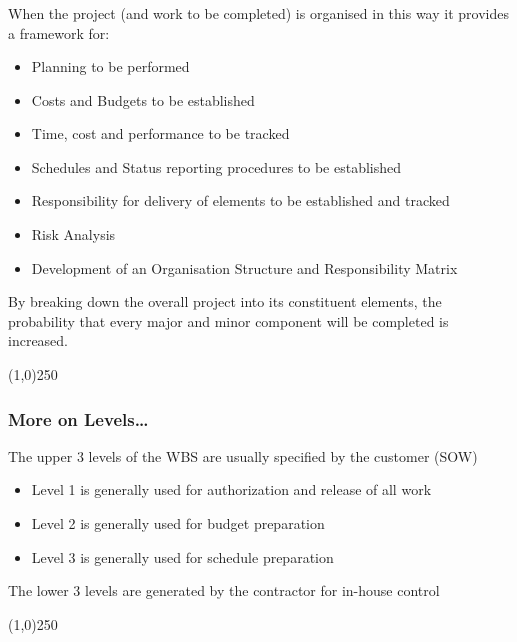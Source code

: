 \begin{frame}
\frametitle{}
When the project (and work to be completed) is organised in this way it provides a framework for:
\begin{itemize}
	\item Planning to be performed
	\item Costs and Budgets to be established
	\item Time, cost and performance to be tracked
	\item Schedules and Status reporting procedures to be established
	\item Responsibility for delivery of elements to be established and tracked
	\item Risk Analysis
	\item Development of an Organisation Structure and Responsibility Matrix
\end{itemize}
By breaking down the overall project into its constituent elements, the probability that every major and minor component will be completed is increased.
\end{frame}\begin{center}\line(1,0){250}\end{center}



\begin{frame}
\frametitle{More on Levels\ldots}
The upper 3 levels of the WBS are usually specified by the customer (SOW)
\begin{itemize}
	\item Level 1 is generally used for authorization and release of all work
	\item Level 2 is generally used for budget preparation
	\item Level 3 is generally used for schedule preparation
\end{itemize}
The lower 3 levels are generated by the contractor for in-house control
\end{frame}\begin{center}\line(1,0){250}\end{center}



